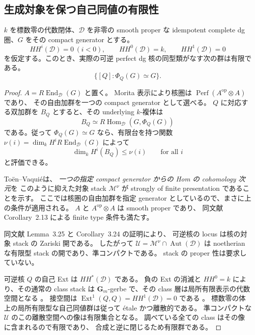 \subsection{生成対象を保つ自己同値の有限性}

\begin{lemma}[剛な自己同値群の生成対象安定化群]
\label{lem:nfm-generator-stabilizer-finite}
$k$ を標数零の代数閉体、$\mathcal D$ を非零の smooth proper な
idempotent complete dg 圏、$G$ をその compact generator とする。
\[
 HH^i(\mathcal D)=0\ (i<0),\qquad
 HH^0(\mathcal D)=k,\qquad HH^1(\mathcal D)=0
\]
を仮定する。このとき、実際の可逆 perfect dg 核の同型類がなす次の群は有限である。
\[
 \{[Q]:\Phi_Q(G)\simeq G\}.
\]
\end{lemma}

\begin{proof}
$A=R\operatorname{End}_{\mathcal D}(G)$ と置く。
Morita 表示により核圏は $\operatorname{Perf}(A^{\mathrm{op}}\otimes A)$ であり、
その自由加群を一つの compact generator として選べる。
$Q$ に対応する双加群を $B_Q$ とすると、その underlying $k$-複体は
\[
 B_Q\simeq R\operatorname{Hom}_{\mathcal D}(G,\Phi_Q(G))
\]
である。従って $\Phi_Q(G)\simeq G$ なら、有限台を持つ関数
$\nu(i)=\dim_k H^iR\operatorname{End}_{\mathcal D}(G)$ によって
\[
 \dim_k H^i(B_Q)\le\nu(i)\qquad\text{for all }i
\]
と評価できる。

To\"en--Vaqui\'e\cite[Section~3.3, Proposition~3.20]{NFMToenVaquieModuli}は、
\emph{一つの指定 compact generator からの Hom の cohomology 次元}を
このように抑えた対象 stack $\mathcal M^\nu$ が strongly of finite presentation であることを示す。
ここでは核圏の自由加群を指定 generator としているので、まさに上の条件が適用される。
$A$ と $A^{\mathrm{op}}\otimes A$ は smooth proper であり、
同文献 Corollary~2.13 による finite type 条件も満たす。

同文献 Lemma~3.25 と Corollary~3.24 の証明により、
可逆核の locus は核の対象 stack の Zariski 開である。
したがって $\mathcal U=\mathcal M^\nu\cap\operatorname{Aut}(\mathcal D)$ は
noetherian な有限型 stack の開であり、準コンパクトである。
stack の proper 性は要求していない。

可逆核 $Q$ の自己 Ext は $HH^*(\mathcal D)$ である。
負の Ext の消滅と $HH^0=k$ により、その通常の class stack は
$\mathbf G_m$-gerbe で、その class 層は局所有限表示の代数空間となる
\cite[Corollaries~3.22, 3.24]{NFMToenVaquieModuli}。
接空間は $\operatorname{Ext}^1(Q,Q)=HH^1(\mathcal D)=0$ である
\cite[Corollary~3.17]{NFMToenVaquieModuli}。
標数零の体上の局所有限型な自己同値群は従って \'etale かつ離散的である。
準コンパクトな $\mathcal U$ のこの離散空間への像は有限集合となる。
調べている全ての class はその像に含まれるので有限であり、
合成と逆に閉じるため有限群である。
\end{proof}

